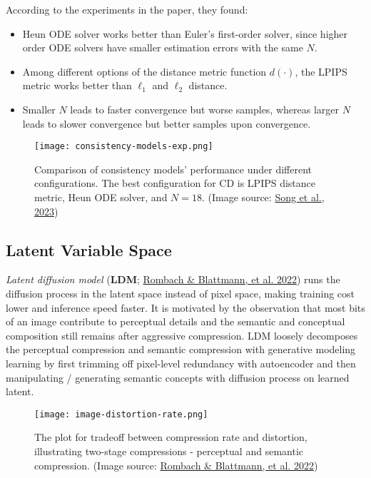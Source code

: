 \documentclass[12pt]{article}
\begin{document}
According to the experiments in the paper, they found:
\begin{itemize}
    \item Heun ODE solver works better than Euler's first-order solver, since higher order ODE solvers have smaller estimation errors with the same $N$.
    \item Among different options of the distance metric function $d(\cdot)$, the LPIPS metric works better than $\ell_1$ and $\ell_2$ distance.
    \item Smaller $N$ leads to faster convergence but worse samples, whereas larger $N$ leads to slower convergence but better samples upon convergence.
\end{itemize}

\begin{figure}[H]
    \centering
    \texttt{[image: consistency-models-exp.png]}
    \caption{Comparison of consistency models' performance under different configurations. The best configuration for CD is LPIPS distance metric, Heun ODE solver, and $N=18$. (Image source: \href{https://arxiv.org/abs/2303.01469}{Song et al., 2023})}
\end{figure}

\subsection{Latent Variable Space}
\label{latent-variable-space}
\emph{Latent diffusion model} (\textbf{LDM}; \href{https://arxiv.org/abs/2112.10752}{Rombach \& Blattmann, et al. 2022}) runs the diffusion process in the latent space instead of pixel space, making training cost lower and inference speed faster. It is motivated by the observation that most bits of an image contribute to perceptual details and the semantic and conceptual composition still remains after aggressive compression. LDM loosely decomposes the perceptual compression and semantic compression with generative modeling learning by first trimming off pixel-level redundancy with autoencoder and then manipulating / generating semantic concepts with diffusion process on learned latent.

\begin{figure}[H]
    \centering
    \texttt{[image: image-distortion-rate.png]}
    \caption{The plot for tradeoff between compression rate and distortion, illustrating two-stage compressions - perceptual and semantic compression. (Image source: \href{https://arxiv.org/abs/2112.10752}{Rombach \& Blattmann, et al. 2022})}
\end{figure}
\end{document}
